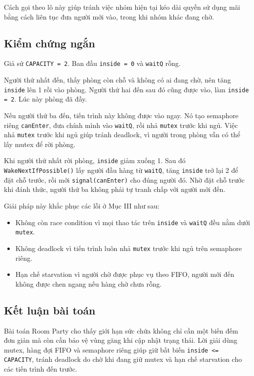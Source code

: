 Cách gọi theo lô này giúp tránh việc nhóm hiện tại kéo dài quyền sử dụng
mãi bằng cách liên tục đưa người mới vào, trong khi nhóm khác đang chờ.

\subsection{Kiểm chứng ngắn}

Giả sử \texttt{CAPACITY = 2}. Ban đầu \texttt{inside = 0} và
\texttt{waitQ} rỗng.

Người thứ nhất đến, thấy phòng còn chỗ và không có ai đang chờ, nên tăng
\texttt{inside} lên 1 rồi vào phòng. Người thứ hai đến sau đó cũng được
vào, làm \texttt{inside = 2}. Lúc này phòng đã đầy.

Nếu người thứ ba đến, tiến trình này không được vào ngay. Nó tạo
semaphore riêng \texttt{canEnter}, đưa chính mình vào \texttt{waitQ}, rồi
nhả \texttt{mutex} trước khi ngủ. Việc nhả \texttt{mutex} trước khi ngủ
giúp tránh deadlock, vì người trong phòng vẫn có thể lấy mutex để rời
phòng.

Khi người thứ nhất rời phòng, \texttt{inside} giảm xuống 1. Sau đó
\texttt{WakeNextIfPossible()} lấy người đầu hàng từ \texttt{waitQ}, tăng
\texttt{inside} trở lại 2 để đặt chỗ trước, rồi mới
\texttt{signal(canEnter)} cho đúng người đó. Nhờ đặt chỗ trước khi đánh
thức, người thứ ba không phải tự tranh chấp với người mới đến.

Giải pháp này khắc phục các lỗi ở Mục III như sau:

\begin{itemize}
    \item Không còn race condition vì mọi thao tác trên \texttt{inside}
    và \texttt{waitQ} đều nằm dưới \texttt{mutex}.
    \item Không deadlock vì tiến trình luôn nhả \texttt{mutex} trước khi
    ngủ trên semaphore riêng.
    \item Hạn chế starvation vì người chờ được phục vụ theo FIFO, người
    mới đến không được chen ngang nếu hàng chờ chưa rỗng.
\end{itemize}

\subsection{Kết luận bài toán}

Bài toán Room Party cho thấy giới hạn sức chứa không chỉ cần một biến đếm
đơn giản mà còn cần bảo vệ vùng găng khi cập nhật trạng thái. Lời giải dùng
mutex, hàng đợi FIFO và semaphore riêng giúp giữ bất biến
\texttt{inside <= CAPACITY}, tránh deadlock do chờ khi đang giữ mutex và hạn
chế starvation cho các tiến trình đến trước.

